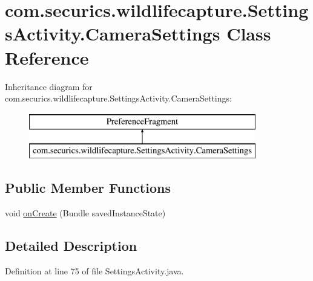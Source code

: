 \hypertarget{classcom_1_1securics_1_1wildlifecapture_1_1_settings_activity_1_1_camera_settings}{\section{com.\+securics.\+wildlifecapture.\+Settings\+Activity.\+Camera\+Settings Class Reference}
\label{classcom_1_1securics_1_1wildlifecapture_1_1_settings_activity_1_1_camera_settings}
}
Inheritance diagram for com.\+securics.\+wildlifecapture.\+Settings\+Activity.\+Camera\+Settings\+:\begin{figure}[H]
\begin{center}
\leavevmode
\includegraphics[height=2.000000cm]{classcom_1_1securics_1_1wildlifecapture_1_1_settings_activity_1_1_camera_settings}
\end{center}
\end{figure}
\subsection*{Public Member Functions}
\begin{DoxyCompactItemize}
\item 
void \hyperlink{classcom_1_1securics_1_1wildlifecapture_1_1_settings_activity_1_1_camera_settings_ac52ed76d6ff8c5fdc96826fda994d186}{on\+Create} (Bundle saved\+Instance\+State)
\end{DoxyCompactItemize}


\subsection{Detailed Description}


Definition at line 75 of file Settings\+Activity.\+java.



